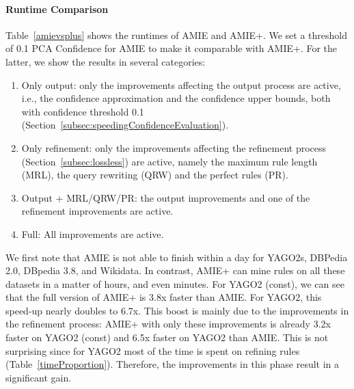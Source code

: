 \paragraph{Runtime Comparison}
Table~\ref{amievsplus} shows the runtimes of AMIE and AMIE+. We set a threshold of 0.1 PCA Confidence for AMIE to make it
comparable with AMIE+. For the latter, we show the results in several categories:
\begin{enumerate}
 \item Only output: only the improvements affecting the output process are active, i.e.,
 the confidence approximation and the confidence upper bounds, both with confidence threshold 0.1 (Section~\ref{subsec:speedingConfidenceEvaluation}).
 \item Only refinement: only the improvements affecting the refinement process (Section~\ref{subsec:lossless}) are active, namely the
 maximum rule length (MRL), the query rewriting (QRW) and the perfect rules (PR).
 \item Output + MRL/QRW/PR: the output improvements and one of the refinement improvements are active.
 \item Full: All improvements are active.
\end{enumerate}
% 
We first note that AMIE is not able to finish within a day for YAGO2s, DBPedia 2.0, DBpedia 3.8, and Wikidata. In contrast,
AMIE+ can mine rules on all these datasets in a matter of hours, and even minutes.
For YAGO2 (const), we can see that the full version of AMIE+ is 3.8x faster than AMIE.
For YAGO2, this speed-up nearly doubles to 6.7x. This boost is mainly due to the improvements
in the refinement process: AMIE+ with only these improvements is already 3.2x faster on YAGO2 (const) and 6.5x faster on YAGO2 than AMIE.
This is not surprising since
for YAGO2 most of the time is spent on refining rules (Table~\ref{timeProportion}). Therefore, the improvements in this phase result in a significant gain.


